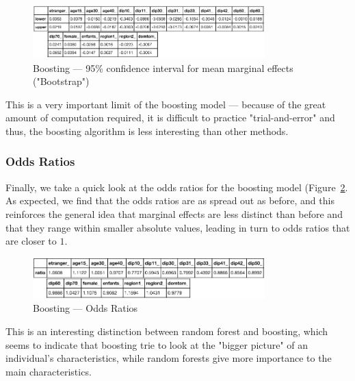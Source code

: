 \begin{figure}
    \centering
    \includegraphics[width=0.8\textwidth]{img/boosting_bootstrap.png}
    \caption{Boosting --- 95\% confidence interval for mean marginal effects ("Bootstrap")}
    \label{fig:boosting_bootstrap}
\end{figure}

This is a very important limit of the boosting model --- because of the great amount of computation required, it is difficult to practice "trial-and-error" and thus, the boosting algorithm is less interesting than other methods.

\subsubsection{Odds Ratios}
Finally, we take a quick look at the odds ratios for the boosting model (Figure~\ref{fig:boosting_odds_ratios}. As expected, we find that the odds ratios are as spread out as before, and this reinforces the general idea that marginal effects are less distinct than before and that they range within smaller absolute values, leading in turn to odds ratios that are closer to $1$.

\begin{figure}
    \centering
    \includegraphics[width=0.8\textwidth]{img/boosting_odds_ratios.png}
    \caption{Boosting --- Odds Ratios}
    \label{fig:boosting_odds_ratios}
\end{figure}

This is an interesting distinction between random forest and boosting, which seems to indicate that boosting trie to look at the "bigger picture" of an individual's characteristics, while random forests give more importance to the main characteristics.

